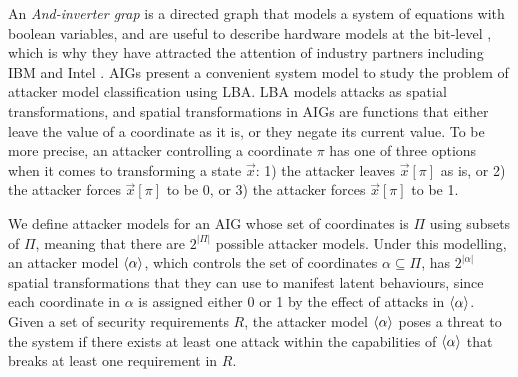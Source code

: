 An \emph{And-inverter grap} is a directed graph that models a system of equations \cite{AIGs,AIGs2} with boolean variables, and are useful to describe hardware models at the bit-level \cite{AIGER}, which is why they have attracted the attention of industry partners including IBM and Intel \cite{HWMCC2014BM}. 
AIGs present a convenient system model to study the problem of attacker model classification using LBA. LBA models attacks as spatial transformations, and spatial transformations in AIGs are functions that either leave the value of a coordinate as it is, or they negate its current value. To be more precise, an attacker controlling a coordinate $\pi$ has one of three options when it comes to transforming a state $\vec{x}$: 1) the attacker leaves $\vec{x}[\pi]$ as is, or 2) the attacker forces $\vec{x}[\pi]$ to be 0, or 3) the attacker forces $\vec{x}[\pi]$ to be 1. 

We define attacker models for an AIG whose set of coordinates is $\Pi$ using subsets of $\Pi$, meaning that there are $2^{|\Pi|}$ possible attacker models. Under this modelling, an attacker model ${{\left<\alpha\right>}}$, which controls the set of coordinates $\alpha\subseteq \Pi$, has $2^{|\alpha|}$ spatial transformations that they can use to manifest latent behaviours, since each coordinate in $\alpha$ is assigned either 0 or 1 by the effect of attacks in ${{\left<\alpha\right>}}$. Given a set of security requirements $R$, the attacker model ${{\left<\alpha\right>}}$ poses a threat to the system if there exists at least one attack within the capabilities of ${{\left<\alpha\right>}}$ that breaks at least one requirement in $R$. 

